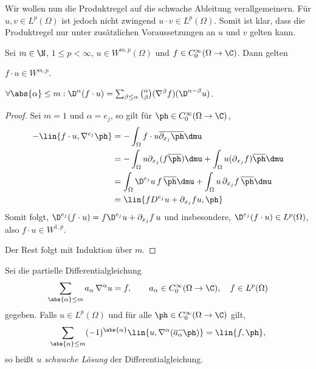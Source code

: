 Wir wollen nun die Produktregel auf die schwache Ableitung verallgemeinern. Für
$u,v\in L^p(\Omega)$ ist jedoch nicht zwingend $u\cdot v\in L^p(\Omega)$. Somit
ist klar, dass die Produktregel nur unter zusätzlichen Voraussetzungen an $u$
und $v$ gelten kann.

\begin{prop}[Produktregel]
\label{prop:7.31}
Sei $m\in\N$, $1\le p < \infty$, $u\in W^{m,p}(\Omega)$ und $f\in
C_0^\infty(\Omega\to \C)$. Dann gelten
\begin{propenum}
\item $f\cdot u\in W^{m,p}$.
\item $\forall \abs{\alpha}\le m : \D^\alpha (f\cdot u) = \sum_{\beta\le
\alpha} \binom{\alpha}{\beta} (\nabla^\beta f) (\D^{\alpha-\beta}u)$.\fishhere
\end{propenum}
\end{prop}

\begin{proof}
Sei $m=1$ und $\alpha=e_j$, so gilt für $\ph\in C_0^\infty(\Omega\to\C)$,
\begin{align*}
-\lin{f\cdot u,\nabla^{e_j}\ph} &= - \int_\Omega f\cdot u
\overline{\partial_{x_j}\ph}\dmu\\
&= - \int_\Omega u
\partial_{x_j}(f\overline{\ph})\dmu
+ \int_\Omega u
(\partial_{x_j}f)\overline{\ph}\dmu\\
&=
\int_\Omega \D^{e_j} u\,
f\,\overline{\ph}\dmu
+ \int_\Omega u\,
\partial_{x_j}f\,\overline{\ph}\dmu\\
&= \lin{f D^{e_j}u + \partial_{x_j}f u,\ph}
\end{align*}
Somit folgt, $\D^{e_j} (f\cdot u) = f\D^{e_j} u + \partial_{x_j}f\, u$ und
insbesondere, $\D^{e_j}(f\cdot u)\in L^p(\Omega)$, also $f\cdot u\in W^{1,p}$.

Der Rest folgt mit Induktion über $m$.\qedhere
\end{proof}

\begin{defn}
\label{defn:7.32}
Sei die partielle Differentialgleichung
\begin{align*}
\sum_{\abs{\alpha}\le m} a_\alpha\, \nabla^\alpha u = f,\qquad
a_\alpha\in C_0^\infty(\Omega\to\C),\quad f\in L^p(\Omega)
\end{align*}
gegeben. Falls $u\in L^p(\Omega)$ und für alle $\ph\in C_0^\infty(\Omega\to\C)$
gilt,
\begin{align*}
\sum_{\abs{\alpha}\le m} (-1)^{\abs{\alpha}}
\lin{u,\nabla^\alpha(\overline{a_\alpha}\ph)} = \lin{f,\ph},
\end{align*}
so heißt $u$ \emph{schwache Lösung} der
Differentialgleichung.\fishhere
\end{defn}

